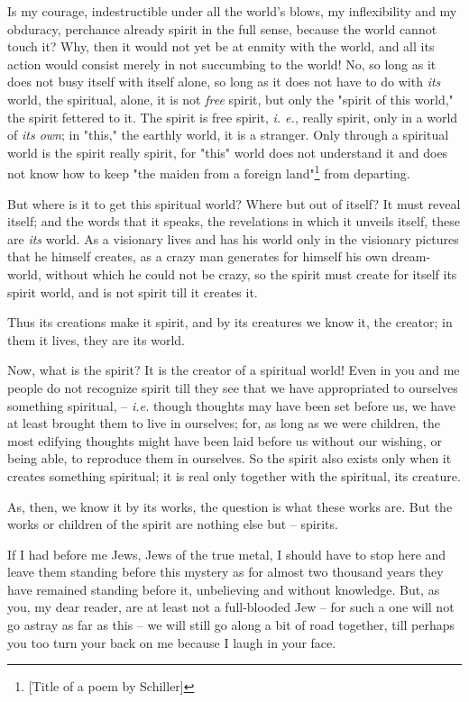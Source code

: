 Is my courage, indestructible under all the world's blows, my inflexibility 
and my obduracy, perchance already spirit in the full sense, because the world 
cannot touch it? Why, then it would not yet be at enmity with the world, and 
all its action would consist merely in not succumbing to the world! No, so 
long as it does not busy itself with itself alone, so long as it does not have 
to do with \textit{its} world, the spiritual, alone, it is not \textit{free} 
spirit, but only the "{}spirit of this world,"{} the spirit fettered to it. 
The spirit is free spirit, \textit{i. e.}, really spirit, only in a world of 
\textit{its own}; in "{}this,"{} the earthly world, it is a stranger. Only 
through a spiritual world is the spirit really spirit, for "{}this"{} world 
does not understand it and does not know how to keep "{}the maiden from a 
foreign land"{}\footnote{[Title of a poem by Schiller]} from departing.

But where is it to get this spiritual world? Where but out of itself? It must 
reveal itself; and the words that it speaks, the revelations in which it 
unveils itself, these are \textit{its} world. As a visionary lives and has his 
world only in the visionary pictures that he himself creates, as a crazy man 
generates for himself his own dream-world, without which he could not be 
crazy, so the spirit must create for itself its spirit world, and is not 
spirit till it creates it.

Thus its creations make it spirit, and by its creatures we know it, the 
creator; in them it lives, they are its world.

Now, what is the spirit? It is the creator of a spiritual world! Even in you 
and me people do not recognize spirit till they see that we have appropriated 
to ourselves something spiritual, -- \textit{i.e.} though thoughts may have 
been set before us, we have at least brought them to live in ourselves; for, 
as long as we were children, the most edifying thoughts might have been laid 
before us without our wishing, or being able, to reproduce them in ourselves. 
So the spirit also exists only when it creates something spiritual; it is real 
only together with the spiritual, its creature.

As, then, we know it by its works, the question is what these works are. But 
the works or children of the spirit are nothing else but -- spirits.

If I had before me Jews, Jews of the true metal, I should have to stop here 
and leave them standing before this mystery as for almost two thousand years 
they have remained standing before it, unbelieving and without knowledge. But, 
as you, my dear reader, are at least not a full-blooded Jew -- for such a one 
will not go astray as far as this -- we will still go along a bit of road 
together, till perhaps you too turn your back on me because I laugh in your 
face.

